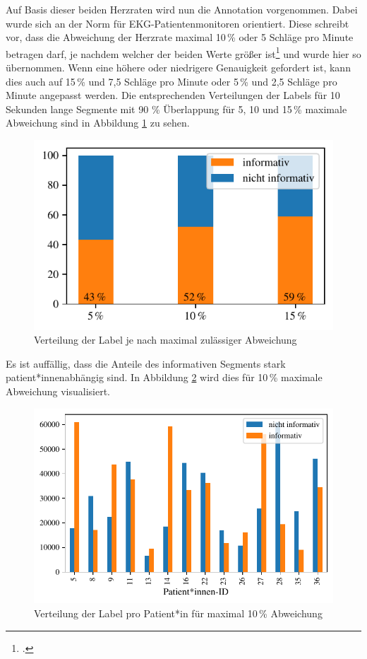 	Auf Basis dieser beiden Herzraten wird nun die Annotation vorgenommen. Dabei wurde sich an der Norm für \ac{EKG}-Patientenmonitoren orientiert. Diese schreibt vor, dass die Abweichung der Herzrate maximal 10\,\% oder 5 Schläge pro Minute betragen darf, je nachdem welcher der beiden Werte größer ist\footcite[]{} und wurde hier so übernommen. Wenn eine höhere oder niedrigere Genauigkeit gefordert ist, kann dies auch auf 15\,\% und 7{,}5 Schläge pro Minute oder 5\,\% und 2{,}5 Schläge pro Minute angepasst werden. Die entsprechenden Verteilungen der Labels für 10 Sekunden lange Segmente mit 90 \% Überlappung für 5, 10 und 15\,\% maximale Abweichung sind in Abbildung \ref{fig:label-distribution} zu sehen.
	
	\begin{figure}[H]
		\centering
		\includegraphics{pic/label-distribution.pdf}
		\caption[Verteilung der Label je nach maximal zulässiger Abweichung]{Verteilung der Label je nach maximal zulässiger Abweichung}
		\label{fig:label-distribution}
	\end{figure}
	
	Es ist auffällig, dass die Anteile des informativen Segments stark patient*innenabhängig sind. In Abbildung \ref{fig:data-stats-15} wird dies für 10\,\% maximale Abweichung visualisiert.
	
	
	\begin{figure}[H]
		\centering
		\includegraphics{pic/data-stats-10.pdf}
		\caption[Verteilung der Label pro Patient*in]{Verteilung der Label pro Patient*in für maximal 10\,\% Abweichung}
		\label{fig:data-stats-15}
	\end{figure}
		

